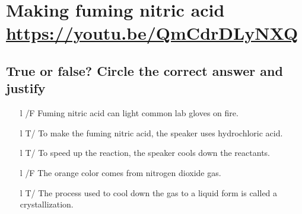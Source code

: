 \documentclass[a4paper, 11pt, final, garamond]{book}
\begin{document}
\setcounter{chapter}{3}


\chapter{Making fuming nitric acid \url{https://youtu.be/QmCdrDLyNXQ}}

\section{True or false\!? \small Circle the correct answer and justify }
\begin{enumerate}[label=\sqenumi, leftmargin=10pt]
	\item[l]{/F} %
	      Fuming nitric acid can light common lab gloves on fire.
	      \smallbreak
	      \smallbreak
	      \dotfill
	\item[l]{T/} %
	      To make the fuming nitric acid, the speaker uses hydrochloric acid.
	      \smallbreak
	      \smallbreak
	      \dotfill
	\item[l]{T/} %
	      To speed up the reaction, the speaker cools down the reactants.
	      \smallbreak
	      \smallbreak
	      \dotfill
	\item[l]{/F} %
	      The orange color comes from nitrogen dioxide gas.
	      \smallbreak
	      \smallbreak
	      \dotfill
	\item[l]{T/} %
	      The process used to cool down the gas to a liquid form is called a
	      crystallization.
	      \smallbreak
\end{enumerate}
\end{document}

